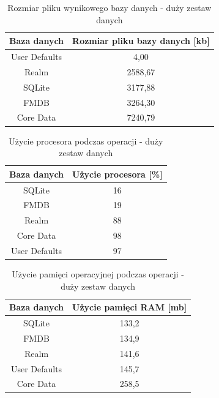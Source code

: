 \newpage

\begin{table}[h]
\centering
\caption{Rozmiar pliku wynikowego bazy danych - duży zestaw danych}
\label{tab: big-save-file-size-table}
\begin{tabular}{|c|c|}
\hline
Baza danych   & Rozmiar pliku bazy danych [kb] \\ \hline
User Defaults & 4,00                           \\ \hline
Realm         & 2588,67                        \\ \hline
SQLite        & 3177,88                        \\ \hline
FMDB          & 3264,30                        \\ \hline
Core Data     & 7240,79                        \\ \hline
\end{tabular}
\end{table}

\begin{table}[h]
\centering
\caption{Użycie procesora podczas operacji - duży zestaw danych}
\label{tab: big-save-cpu-table}
\begin{tabular}{|c|c|}
\hline
Baza danych   & Użycie procesora [\%] \\ \hline
SQLite        & 16                    \\ \hline
FMDB          & 19                    \\ \hline
Realm         & 88                    \\ \hline
Core Data & 98                    \\ \hline
User Defaults    & 97                    \\ \hline
\end{tabular}
\end{table}

\begin{table}[h]
\centering
\caption{Użycie pamięci operacyjnej podczas operacji - duży zestaw danych}
\label{tab: big-save-ram-table}
\begin{tabular}{|c|c|}
\hline
Baza danych   & Użycie pamięci RAM [mb] \\ \hline
SQLite        & 133,2                   \\ \hline
FMDB          & 134,9                   \\ \hline
Realm         & 141,6                   \\ \hline
User Defaults & 145,7                   \\ \hline
Core Data     & 258,5                   \\ \hline
\end{tabular}
\end{table}


